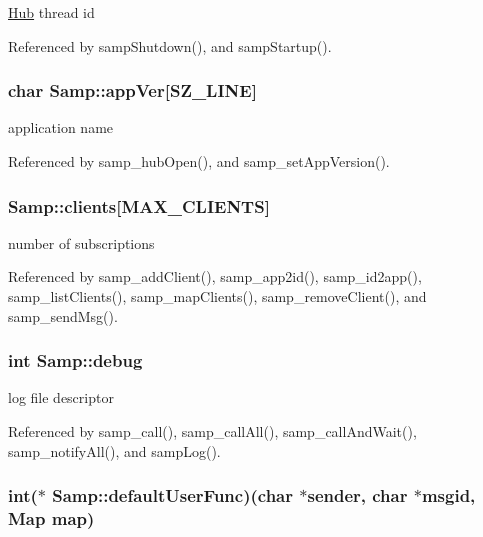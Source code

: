 \hyperlink{structHub}{Hub} thread id 

Referenced by sampShutdown(), and sampStartup().\hypertarget{structSamp_bc903d82fc1310fa96fe5b4e64a30fca}{
\subsubsection[{appVer}]{\setlength{\rightskip}{0pt plus 5cm}char {\bf Samp::appVer}\mbox{[}SZ\_\-LINE\mbox{]}}}
\label{structSamp_bc903d82fc1310fa96fe5b4e64a30fca}


application name 

Referenced by samp\_\-hubOpen(), and samp\_\-setAppVersion().\hypertarget{structSamp_88b93a7a3dbafd6dabba7c76c40ec9d0}{
\subsubsection[{clients}]{ {\bf Samp::clients}\mbox{[}MAX\_\-CLIENTS\mbox{]}}}
\label{structSamp_88b93a7a3dbafd6dabba7c76c40ec9d0}


number of subscriptions 

Referenced by samp\_\-addClient(), samp\_\-app2id(), samp\_\-id2app(), samp\_\-listClients(), samp\_\-mapClients(), samp\_\-removeClient(), and samp\_\-sendMsg().\hypertarget{structSamp_d8469d2447cd872101fb83d92f85049e}{
\subsubsection[{debug}]{\setlength{\rightskip}{0pt plus 5cm}int {\bf Samp::debug}}}
\label{structSamp_d8469d2447cd872101fb83d92f85049e}


log file descriptor 

Referenced by samp\_\-call(), samp\_\-callAll(), samp\_\-callAndWait(), samp\_\-notifyAll(), and sampLog().\hypertarget{structSamp_eb399d3fb381bee752b5747ff4cb9a9b}{
\subsubsection[{defaultUserFunc}]{\setlength{\rightskip}{0pt plus 5cm}int($\ast$ {\bf Samp::defaultUserFunc})(char $\ast$sender, char $\ast$msgid, {\bf Map} map)}}
\label{structSamp_eb399d3fb381bee752b5747ff4cb9a9b}


